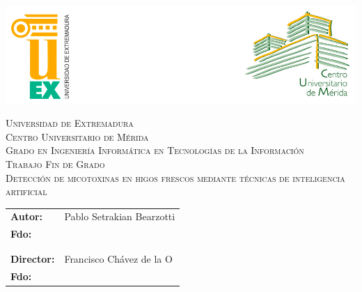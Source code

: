 \pagestyle{empty}

\begin{center}
	\newcommand{\HRule}{\rule{\linewidth}{0.7mm}}
	\begin{center}
            \includegraphics[width=\columnwidth, keepaspectratio]{images/logo.png}\\
        \end{center}
	
	\vspace*{2cm}
	\textsc{\large Universidad de Extremadura}\\[0.5cm]
	\textsc{\large Centro Universitario de Mérida}\\[1.3cm]
	\textsc{\LARGE Grado en Ingeniería Informática en Tecnologías de la Información}\\[1.3cm]
	\textsc{\huge Trabajo Fin de Grado}\\[2 cm]
	\textsc{\LARGE Detección de micotoxinas en higos frescos mediante técnicas de inteligencia artificial}\\[1.5 cm]

\end{center}

\begin{flushleft}
	\begin{tabular}{ll}
		\large{\textbf{Autor:}}	&
		\large{Pablo Setrakian Bearzotti} \\
		\large{\textbf{Fdo:}} & \\
		\\
		\\
		\large{\textbf{Director:}}	&
		\large{Francisco Chávez de la O} \\
		\large{\textbf{Fdo:}} & \\
	\end{tabular}
\end{flushleft}
